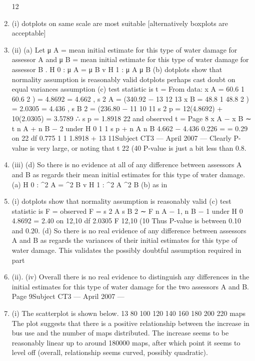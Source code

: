 \documentclass[a4paper,12pt]{article}
\begin{document}
\begin{enumerate}
12
\item (i)
dotplots on same scale are most suitable
[alternatively boxplots are acceptable]
\item (ii)
(a)
Let μ A = mean initial estimate for this type of water damage for assessor A and μ B = mean initial estimate for this type of water damage
for assessor B .
H 0 : μ A = μ B v H 1 : μ A \neq μ B
(b) dotplots show that normality assumption is reasonably valid
dotplots perhaps cast doubt on equal variances assumption
(c) test statistic is t =
From data: x A = 60.6
1
60.6 2
) = 4.8692
= 4.662 , s 2 A = (340.92 −
13
12
13
x B = 48.8
1
48.8 2
) = 2.0305
= 4.436 , s B 2 = (236.80 −
11
10
11
s 2 p = 12(4.8692) + 10(2.0305)
= 3.5789 ∴ s p = 1.8918
22
and
observed t =
Page 8
x A − x B
∼ t n A + n B − 2 under H 0
1
1
s p
+
n A n B
4.662 − 4.436
0.226
=
= 0.29 on 22 df
0.775
1 1
1.8918
+
13 11Subject CT3  — April 2007 — %
Clearly P-value is very large, or noting that t 22 (40%
P-value is just a bit less than 0.8.
\item (iii)
(d) So there is no evidence at all of any difference between assessors A and B as regards their mean initial estimates for this type of water damage.
(a) H 0 : \sigma^2 A = \sigma^2 B v H 1 : \sigma^2 A \neq \sigma^2 B
(b) as in \item (i) dotplots show that normality assumption is reasonably valid
(c) test statistic is F =
observed F =
s 2 A
s B 2
∼ F n A − 1, n B − 1 under H 0
4.8692
= 2.40 on 12,10 df
2.0305
F 12,10 (10%
Thus P-value is between 0.10 and 0.20.
(d)
So there is no real evidence of any difference between assessors A and B as regards the variances of their initial estimates for this type of water damage.
This validates the possibly doubtful assumption required in part \item (ii).
(iv)
Overall there is no real evidence to distinguish any differences in the initial
estimates for this type of water damage for the two assessors A and B.
Page 9Subject CT3  — April 2007 — %
\item (i)
The scatterplot is shown below.
13
80
100
120
140
160
180
200
220
maps
The plot suggests that there is a positive relationship between the increase in  bus use and the number of maps distributed. The increase seems to be reasonably linear up to around 180000 maps, after which point it seems to
level off (overall, relationship seems curved, possibly quadratic).

\end{enumerate}
\end{document}
